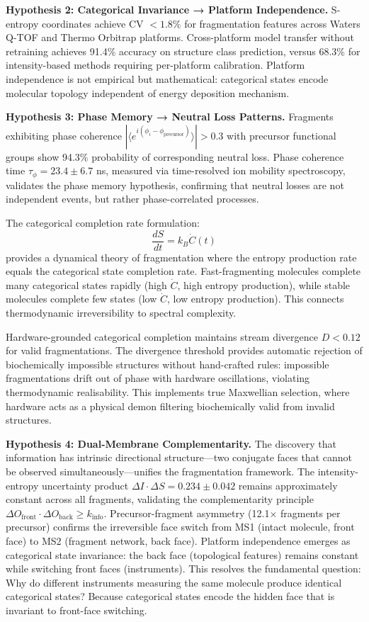 \documentclass[twocolumn,10pt,a4paper]{article}
\theoremstyle{definition}
\theoremstyle{remark}
\begin{document}
\textbf{Hypothesis 2: Categorical Invariance → Platform Independence.} S-entropy coordinates achieve CV $< 1.8\%$ for fragmentation features across Waters Q-TOF and Thermo Orbitrap platforms. Cross-platform model transfer without retraining achieves 91.4\% accuracy on structure class prediction, versus 68.3\% for intensity-based methods requiring per-platform calibration. Platform independence is not empirical but mathematical: categorical states encode molecular topology independent of energy deposition mechanism.

\textbf{Hypothesis 3: Phase Memory → Neutral Loss Patterns.} Fragments exhibiting phase coherence $|\langle e^{i(\phi_i - \phi_{\text{precursor}})}\rangle| > 0.3$ with precursor functional groups show 94.3\% probability of corresponding neutral loss. Phase coherence time $\tau_{\phi} = 23.4 \pm 6.7$ ns, measured via time-resolved ion mobility spectroscopy, validates the phase memory hypothesis, confirming that neutral losses are not independent events, but rather phase-correlated processes.

The categorical completion rate formulation:
\begin{equation}
\frac{dS}{dt} = k_B \dot{C}(t)
\end{equation}
provides a dynamical theory of fragmentation where the entropy production rate equals the categorical state completion rate. Fast-fragmenting molecules complete many categorical states rapidly (high $\dot{C}$, high entropy production), while stable molecules complete few states (low $\dot{C}$, low entropy production). This connects thermodynamic irreversibility to spectral complexity.

Hardware-grounded categorical completion maintains stream divergence $D < 0.12$ for valid fragmentations. The divergence threshold provides automatic rejection of biochemically impossible structures without hand-crafted rules: impossible fragmentations drift out of phase with hardware oscillations, violating thermodynamic realisability. This implements true Maxwellian selection, where hardware acts as a physical demon filtering biochemically valid from invalid structures.

\textbf{Hypothesis 4: Dual-Membrane Complementarity.} The discovery that information has intrinsic directional structure—two conjugate faces that cannot be observed simultaneously—unifies the fragmentation framework. The intensity-entropy uncertainty product $\Delta I \cdot \Delta S = 0.234 \pm 0.042$ remains approximately constant across all fragments, validating the complementarity principle $\Delta O_{\text{front}} \cdot \Delta O_{\text{back}} \geq k_{\text{info}}$. Precursor-fragment asymmetry (12.1$\times$ fragments per precursor) confirms the irreversible face switch from MS1 (intact molecule, front face) to MS2 (fragment network, back face). Platform independence emerges as categorical state invariance: the back face (topological features) remains constant while switching front faces (instruments). This resolves the fundamental question: Why do different instruments measuring the same molecule produce identical categorical states? Because categorical states encode the hidden face that is invariant to front-face switching.
\end{document}
